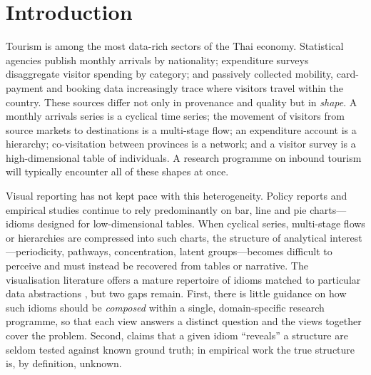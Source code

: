 \documentclass[11pt,a4paper]{article}
\begin{document}
\section{Introduction}\label{sec:intro}

Tourism is among the most data-rich sectors of the Thai economy. Statistical agencies publish monthly
arrivals by nationality; expenditure surveys disaggregate visitor spending by category; and passively
collected mobility, card-payment and booking data increasingly trace where visitors travel within the
country. These sources differ not only in provenance and quality but in \emph{shape}. A monthly arrivals
series is a cyclical time series; the movement of visitors from source markets to destinations is a
multi-stage flow; an expenditure account is a hierarchy; co-visitation between provinces is a network; and a
visitor survey is a high-dimensional table of individuals. A research programme on inbound tourism will
typically encounter all of these shapes at once.

Visual reporting has not kept pace with this heterogeneity. Policy reports and empirical studies continue to
rely predominantly on bar, line and pie charts---idioms designed for low-dimensional tables. When cyclical
series, multi-stage flows or hierarchies are compressed into such charts, the structure of analytical
interest---periodicity, pathways, concentration, latent groups---becomes difficult to perceive and must
instead be recovered from tables or narrative. The visualisation literature offers a mature repertoire of
idioms matched to particular data abstractions \citep{heer2010zoo,munzner2014}, but two gaps remain. First,
there is little guidance on how such idioms should be \emph{composed} within a single, domain-specific
research programme, so that each view answers a distinct question and the views together cover the problem.
Second, claims that a given idiom ``reveals'' a structure are seldom tested against known ground truth; in
empirical work the true structure is, by definition, unknown.
\end{document}
